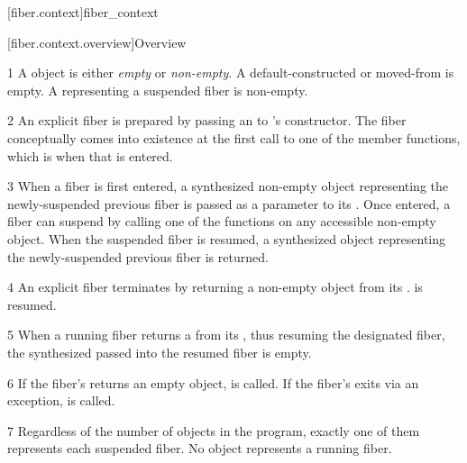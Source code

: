 
\setcounter{section}{33}
\setcounter{subsection}{11}
\setcounter{secnumdepth}{4}

\cbstart

[fiber.context]{fiber\_context}

[fiber.context.overview]{Overview}

1 A \fiber object is either \emph{empty} or \emph{non-empty}. A
default-constructed or moved-from \fiber is empty. A \fiber
representing a suspended fiber is non-empty.

2 An explicit fiber is prepared by passing an \emph{\entryfn} to \fiber's
constructor. The fiber conceptually comes into existence at the first call to
one of the \anyresume member functions, which is when that \entryfn is
entered.

3 When a fiber is first entered, a synthesized non-empty \fiber object
representing the newly-suspended previous fiber is passed as a parameter to
its \entryfn. Once entered, a fiber can suspend by calling one of the \anyresume
functions on any accessible non-empty \fiber object. When the
suspended fiber is resumed, a synthesized \fiber object
representing the newly-suspended previous fiber is returned.

4 An explicit fiber terminates by returning a non-empty \fiber object from
its \entryfn.  is resumed.



5 When a running fiber returns a \fiber from its \entryfn, thus resuming the
designated fiber, the synthesized \fiber passed into the resumed fiber is
empty.

6 If the fiber's \entryfn returns an empty \fiber object,  is called.
If the fiber's \entryfn exits via an exception,  is called.

7 Regardless of the number of \fiber objects in the program, exactly one of them
represents each suspended fiber. No \fiber object represents a running fiber.

